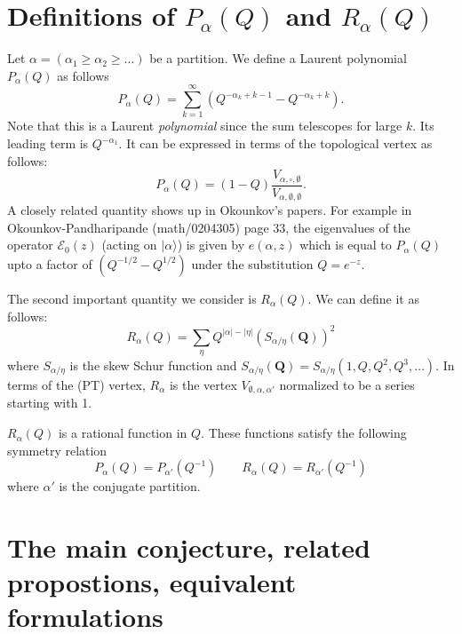 \documentclass{amsart}
\theoremstyle{definition}
\begin{document}
\section{Definitions of $P_{\alpha } (Q)$ and $R_{\alpha } (Q)$}

Let $\alpha =(\alpha _{1}\geq  \alpha _{2}\geq \dots )$ be a
partition. We define a Laurent polynomial $P_{\alpha } (Q)$ as follows
\[
P_{\alpha } (Q) = \sum _{k=1}^{\infty } ( Q^{-\alpha _{k}+k-1}-Q^{-\alpha _{k}+k} ).
\]
Note that this is a Laurent \emph{polynomial} since the sum telescopes
for large $k$. Its leading term is $Q^{-\alpha _{1}}$. It can be
expressed in terms of the topological vertex as follows:
\[
P_{\alpha } (Q) = (1-Q)\frac{V_{\alpha ,\square,\emptyset }}{V_{\alpha
,\emptyset ,\emptyset }}.
\]
A closely related quantity shows up in Okounkov's papers. For example
in Okounkov-Pandharipande (math/0204305) page 33, the eigenvalues of
the operator $\mathcal{E}_{0} (z)$ (acting on $|\alpha\rangle $) is
given by $e (\alpha ,z)$ which is equal to $P_{\alpha } (Q)$ upto a
factor of $(Q^{-1/2}-Q^{1/2})$ under the substitution $Q=e^{-z}$.

The second important quantity we consider is $R_{\alpha } (Q)$. We can
define it as follows:
\[
R_{\alpha } (Q) = \sum _{\eta } Q^{|\alpha |-|\eta |} \left(S_{\alpha /\eta } (\mathbf{Q}) \right)^{2}
\]
where $S_{\alpha /\eta }$ is the skew Schur function and $S_{\alpha
/\eta } (\mathbf{Q}) = S_{\alpha /\eta } (1,Q,Q^{2},Q^{3},\dots )$.
In terms of the (PT) vertex, $R_{\alpha }$ is the vertex $V_{\emptyset
,\alpha ,\alpha '}$ normalized to be a series starting with 1.

$R_{\alpha } (Q)$ is a rational function in $Q$. These functions satisfy the following symmetry relation
\[
P_{\alpha } (Q)=P_{\alpha '} (Q^{-1}) \quad \quad R_{\alpha } (Q)=R_{\alpha '} (Q^{-1}) 
\]
where $\alpha '$ is the conjugate partition.

\section{The main conjecture, related propostions, equivalent formulations}
\end{document}
